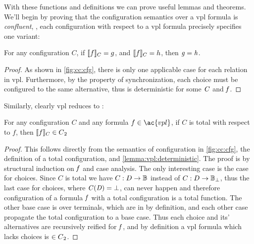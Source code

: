 With these functions and definitions we can prove useful lemmas and theorems.
%
We'll begin by proving that the configuration semantics over a \ac{vpl} formula
is \emph{confluent}, \ie{}, each configuration with respect to a \ac{vpl}
formula precisely specifies one variant:
%
\begin{lemma}%
  \label{lemma:vpl:deterministic}
  For any configuration $C$, if \ensuremath{\semL f \semR_{C} = g}, and
  \ensuremath{\semL f \semR_{C} = h}, then $\mathit{g} = \mathit{h}$.
\end{lemma}
%
\begin{proof}
  As shown in \autoref{fig:cc:cfg}, there is only one applicable case for each
  relation in \ac{vpl}. Furthermore, by the property of synchronization, each
  choice must be configured to the same alternative, thus  is
  deterministic for some $\mathit{C}$ and $\mathit{f}$.
\end{proof}

Similarly, clearly \ac{vpl} reduces to \pl{}:
%
\begin{theorem}%
  \label{thm:vpltopl}
  For any configuration $C$ and any formula $f \in \ac{vpl}$, if $C$ is total
  with respect to $f$, then $\sem[C]{f} \in \pl{}$
\end{theorem}
%
\begin{proof}
  This follows directly from the semantics of configuration in
  \autoref{fig:cc:cfg}, the definition of a total configuration, and
  \autoref{lemma:vpl:deterministic}. The proof is by structural induction on
  $\mathit{f}$ and case analysis. The only interesting case is the case for choices.
  Since $C$ is total we have $C : D \rightarrow \mathbb{B}{}$ instead of $C : D
  \rightarrow \mathbb{B}{}_{\bot}$, thus the last case for choices, where
  $\mathit{C(D)} = \bot$, can never happen and therefore configuration of a formula
  $\mathit{f}$ with a total configuration is a total function. The other base case
  is over terminals, which are in \pl{} by definition, and each other case
  propagate the total configuration to a base case. Thus each choice and its'
  alternatives are recursively reified for $\mathit{f}$, and by definition a
  \ac{vpl} formula which lacks choices is $\in {C\textsubscript{2}}{}$.
\end{proof}


